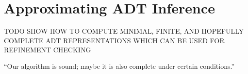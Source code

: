 \section{Approximating ADT Inference}
\label{sec:algorithm}

TODO SHOW HOW TO COMPUTE MINIMAL, FINITE, AND HOPEFULLY COMPLETE ADT
REPRESENTATIONS WHICH CAN BE USED FOR REFINEMENT CHECKING

\begin{theorem}
  “Our algorithm is sound; maybe it is also complete under certain conditions.”
\end{theorem}
